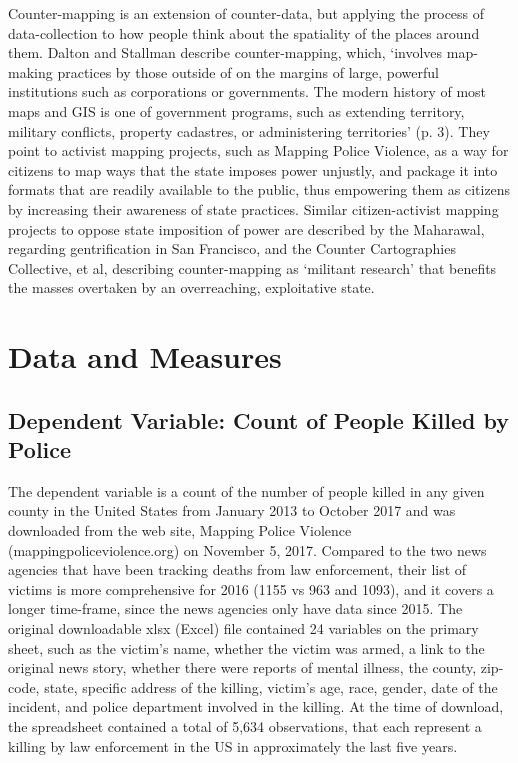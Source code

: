 \documentclass[sigconf]{acmart}
\begin{document}
Counter-mapping is an extension of counter-data, but applying the process of data-collection to how people think about the spatiality of the places around them.  Dalton and Stallman describe counter-mapping, which, `involves map-making practices by those outside of on the margins of large, powerful institutions such as corporations or governments. \cite{dalton17} The modern history of most maps and GIS is one of government programs, such as extending territory, military conflicts, property cadastres, or administering territories' (p. 3).  They point to activist mapping projects, such as Mapping Police Violence, as a way for citizens to map ways that the state imposes power unjustly, and package it into formats that are readily available to the public, thus empowering them as citizens by increasing their awareness of state practices. Similar citizen-activist mapping projects to oppose state imposition of power are described by the Maharawal, regarding gentrification in San Francisco, and the Counter Cartographies Collective, et al, describing counter-mapping as `militant research' that benefits the masses overtaken by an overreaching, exploitative state. \cite{maharawal17,ccc12}

\section{Data and Measures}
\subsection{Dependent Variable: Count of People Killed by Police}
The dependent variable is a count of the number of people killed in any given county in the United States from January 2013 to October 2017 and was downloaded from the web site, Mapping Police Violence (mappingpoliceviolence.org) on November 5, 2017.  Compared to the two news agencies that have been tracking deaths from law enforcement, their list of victims is more comprehensive for 2016 (1155 vs 963 and 1093), and it covers a longer time-frame, since the news agencies only have data since 2015.  The original downloadable xlsx (Excel) file contained 24 variables on the primary sheet, such as the victim's name, whether the victim was armed, a link to the original news story, whether there were reports of mental illness, the county, zip-code, state, specific address of the killing, victim's age, race, gender, date of the incident, and police department involved in the killing. At the time of download, the spreadsheet contained a total of 5,634 observations, that each represent a killing by law enforcement in the US in approximately the last five years.
\end{document}
